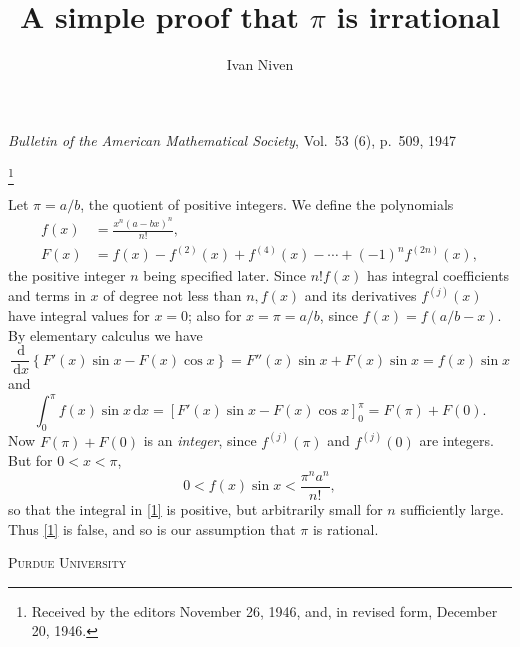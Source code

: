 \documentclass[leqno]{article}
\title{A simple proof that $\pi$ is irrational}
\author{Ivan Niven}
\date{}
\newcommand\blfootnote[1]{
	\begingroup
	\renewcommand\thefootnote{}\footnote{#1}
	\addtocounter{footnote}{-1}
	\endgroup
}
\newcommand{\dd}{\,\mathrm{d}}
\begin{document}
	
\noindent
\emph{Bulletin of the American Mathematical Society}, Vol.\ 53 (6), p.\ 509, 1947
\blfootnote{Received by the editors November 26, 1946, and, in revised form, December 20, 1946.}

{\let\newpage\relax\maketitle}

\maketitle

Let $\pi=a / b$, the quotient of positive integers. We define the polynomials
\begin{align*}
	f(x) &=\frac{x^{n}(a-b x)^{n}}{n !}, \\
	F(x) &=f(x)-f^{(2)}(x)+f^{(4)}(x)-\cdots+(-1)^{n} f^{(2 n)}(x),
\end{align*}
the positive integer $n$ being specified later. Since $n ! f(x)$ has integral coefficients and terms in $x$ of degree not less than $n, f(x)$ and its derivatives $f^{(j)}(x)$ have integral values for $x=0$; also for $x=\pi=a / b$, since $f(x)=f(a / b-x)$. By elementary calculus we have
\begin{equation*}
	\frac{\dd}{\dd x}\left\{F'(x) \sin x-F(x) \cos x\right\}=F''(x) \sin x+F(x) \sin x=f(x) \sin x
\end{equation*}
and
\begin{equation} \label{1}
	\int_{0}^{\pi} f(x) \sin x \dd x=\left[F'(x) \sin x-F(x) \cos x\right]_{0}^{\pi}=F(\pi)+F(0).
\end{equation}
Now $F(\pi)+F(0)$ is an \emph{integer}, since $f^{(j)}(\pi)$ and $f^{(j)}(0)$ are integers. But for $0<x<\pi$,
\begin{equation*}
	0<f(x) \sin x<\frac{\pi^{n} a^{n}}{n !},
\end{equation*}
so that the integral in \eqref{1} is positive, but arbitrarily small for $n$ sufficiently large. Thus \eqref{1} is false, and so is our assumption that $\pi$ is rational.

\bigskip
\textsc{Purdue University}
\end{document}
